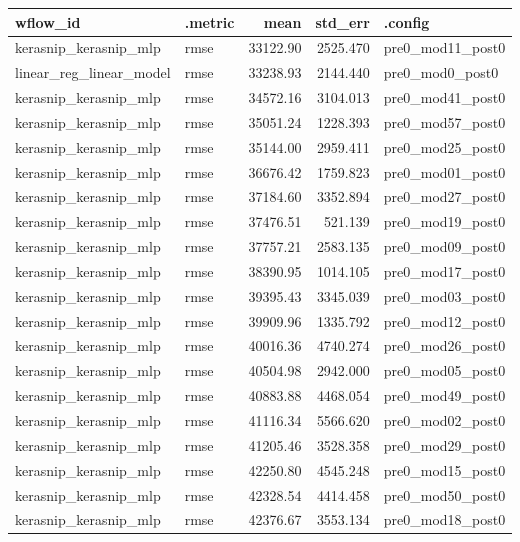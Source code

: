 \begin{table}
\centering\begingroup\fontsize{7}{9}\selectfont

\begin{tabular}{llrrl}
\toprule
wflow\_id & .metric & mean & std\_err & .config\\
\midrule
kerasnip\_kerasnip\_mlp & rmse & 33122.90 & 2525.470 & pre0\_mod11\_post0\\
linear\_reg\_linear\_model & rmse & 33238.93 & 2144.440 & pre0\_mod0\_post0\\
kerasnip\_kerasnip\_mlp & rmse & 34572.16 & 3104.013 & pre0\_mod41\_post0\\
kerasnip\_kerasnip\_mlp & rmse & 35051.24 & 1228.393 & pre0\_mod57\_post0\\
kerasnip\_kerasnip\_mlp & rmse & 35144.00 & 2959.411 & pre0\_mod25\_post0\\
\addlinespace
kerasnip\_kerasnip\_mlp & rmse & 36676.42 & 1759.823 & pre0\_mod01\_post0\\
kerasnip\_kerasnip\_mlp & rmse & 37184.60 & 3352.894 & pre0\_mod27\_post0\\
kerasnip\_kerasnip\_mlp & rmse & 37476.51 & 521.139 & pre0\_mod19\_post0\\
kerasnip\_kerasnip\_mlp & rmse & 37757.21 & 2583.135 & pre0\_mod09\_post0\\
kerasnip\_kerasnip\_mlp & rmse & 38390.95 & 1014.105 & pre0\_mod17\_post0\\
\addlinespace
kerasnip\_kerasnip\_mlp & rmse & 39395.43 & 3345.039 & pre0\_mod03\_post0\\
kerasnip\_kerasnip\_mlp & rmse & 39909.96 & 1335.792 & pre0\_mod12\_post0\\
kerasnip\_kerasnip\_mlp & rmse & 40016.36 & 4740.274 & pre0\_mod26\_post0\\
kerasnip\_kerasnip\_mlp & rmse & 40504.98 & 2942.000 & pre0\_mod05\_post0\\
kerasnip\_kerasnip\_mlp & rmse & 40883.88 & 4468.054 & pre0\_mod49\_post0\\
\addlinespace
kerasnip\_kerasnip\_mlp & rmse & 41116.34 & 5566.620 & pre0\_mod02\_post0\\
kerasnip\_kerasnip\_mlp & rmse & 41205.46 & 3528.358 & pre0\_mod29\_post0\\
kerasnip\_kerasnip\_mlp & rmse & 42250.80 & 4545.248 & pre0\_mod15\_post0\\
kerasnip\_kerasnip\_mlp & rmse & 42328.54 & 4414.458 & pre0\_mod50\_post0\\
kerasnip\_kerasnip\_mlp & rmse & 42376.67 & 3553.134 & pre0\_mod18\_post0\\

\end{tabular}
\end{table}

